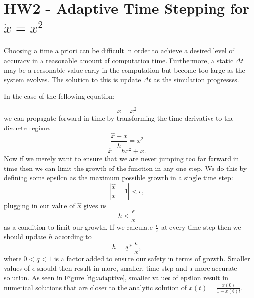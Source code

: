 \documentclass[]{article}
\begin{document}
\section{HW2 - Adaptive Time Stepping for $\dot{x}=x^2$}
Choosing a time a priori can be difficult in order to achieve a desired level of accuracy in a reasonable amount of computation time. Furthermore, a static $\Delta t$ may be a reasonable value early in the computation but become too large as the system evolves. The solution to this is update $\Delta t$ as the simulation progresses. 

In the case of the following equation:

\begin{equation}
\dot{x} = x^2
\label{eq:ODE_thing}
\end{equation}
we can propagate forward in time by transforming the time derivative to the discrete regime.
\begin{equation}
\frac{\hat{x}-x}{h} = x^2
\end{equation}
\begin{equation}
\hat{x} = hx^2+x.
\end{equation}
Now if we merely want to ensure that we are never jumping too far forward in time then we can limit the growth of the function in any one step. We do this by defining some epsilon as the maximum possible growth in a single time step:
\begin{equation}
|\frac{\hat{x}}{x}-1| < \epsilon,
\end{equation}
plugging in our value of $\hat{x}$ gives us
\begin{equation}
h < \frac{\epsilon}{x}
\end{equation}
as a condition to limit our growth. If we calculate $\frac{\epsilon}{x}$ at every time step then we should update $h$ according to 
\begin{equation}
h = q*\frac{\epsilon}{x},
\end{equation}
where $0<q<1$ is a factor added to ensure our safety in terms of growth. Smaller values of $\epsilon$ should then result in more, smaller, time step and a more accurate solution. As seen in Figure \ref{fig:adaptive}, smaller values of epsilon result in numerical solutions that are closer to the analytic solution of $x(t) = \frac{x(0)}{1-x(0)t}$.
\end{document}
